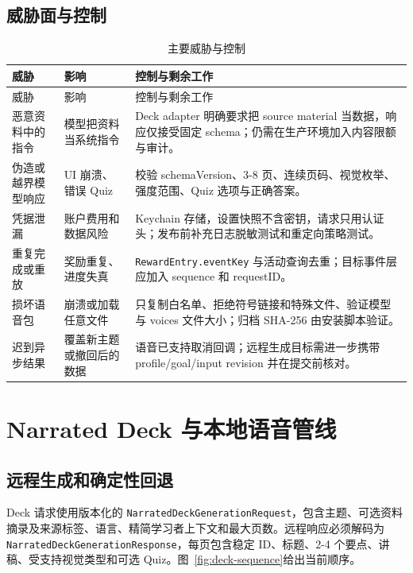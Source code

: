 \documentclass[11pt,a4paper,fontset=none]{ctexart}
\newcommand{\code}[1]{\begingroup\urlstyle{tt}\nolinkurl{#1}\endgroup}
\begin{document}
\subsection{威胁面与控制}
\begin{longtable}{P{31mm}P{50mm}P{70mm}}
\caption{主要威胁与控制}\label{tab:threats}\\
\toprule
威胁 & 影响 & 控制与剩余工作 \\
\midrule
\endfirsthead
\toprule
威胁 & 影响 & 控制与剩余工作 \\
\midrule
\endhead
恶意资料中的指令 & 模型把资料当系统指令 & Deck adapter 明确要求把 source material 当数据，响应仅接受固定 schema；仍需在生产环境加入内容限额与审计。 \\
伪造或越界模型响应 & UI 崩溃、错误 Quiz & 校验 schemaVersion、3-8 页、连续页码、视觉枚举、强度范围、Quiz 选项与正确答案。 \\
凭据泄漏 & 账户费用和数据风险 & Keychain 存储，设置快照不含密钥，请求只用认证头；发布前补充日志脱敏测试和重定向策略测试。 \\
重复完成或重放 & 奖励重复、进度失真 & \code{RewardEntry.eventKey} 与活动查询去重；目标事件层应加入 sequence 和 requestID。 \\
损坏语音包 & 崩溃或加载任意文件 & 只复制白名单、拒绝符号链接和特殊文件、验证模型与 voices 文件大小；归档 SHA-256 由安装脚本验证。 \\
迟到异步结果 & 覆盖新主题或撤回后的数据 & 语音已支持取消回调；远程生成目标需进一步携带 profile/goal/input revision 并在提交前核对。 \\
\bottomrule
\end{longtable}

\section{Narrated Deck 与本地语音管线}

\subsection{远程生成和确定性回退}
Deck 请求使用版本化的 \code{NarratedDeckGenerationRequest}，包含主题、可选资料摘录及来源标签、语言、精简学习者上下文和最大页数。远程响应必须解码为 \code{NarratedDeckGenerationResponse}，每页包含稳定 ID、标题、2-4 个要点、讲稿、受支持视觉类型和可选 Quiz。图~\ref{fig:deck-sequence}给出当前顺序。
\end{document}
